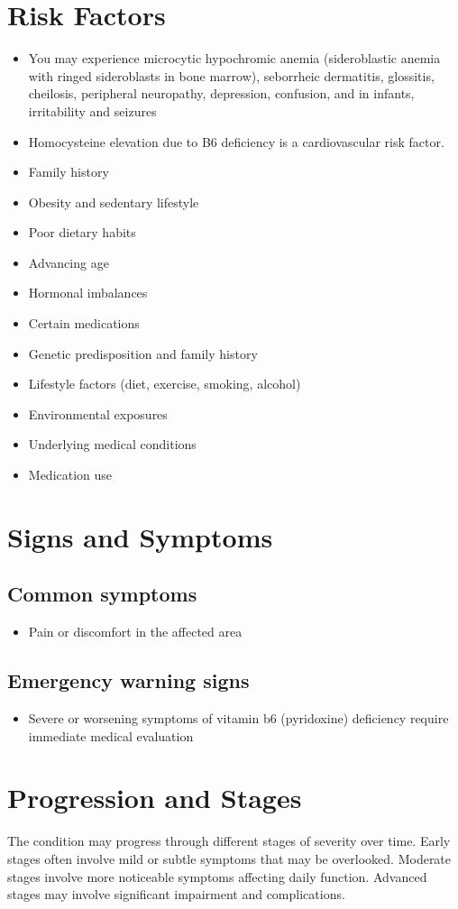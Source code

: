 \section{Risk Factors}
\begin{itemize}[noitemsep]
  \item You may experience microcytic hypochromic anemia (sideroblastic anemia with ringed sideroblasts in bone marrow), seborrheic dermatitis, glossitis, cheilosis, peripheral neuropathy, depression, confusion, and in infants, irritability and seizures
  \item Homocysteine elevation due to B6 deficiency is a cardiovascular risk factor.
  \item Family history
  \item Obesity and sedentary lifestyle
  \item Poor dietary habits
  \item Advancing age
  \item Hormonal imbalances
  \item Certain medications
  \item Genetic predisposition and family history
  \item Lifestyle factors (diet, exercise, smoking, alcohol)
  \item Environmental exposures
  \item Underlying medical conditions
  \item Medication use
\end{itemize}
\section{Signs and Symptoms}
\subsection{Common symptoms}
\begin{itemize}[noitemsep]
  \item Pain or discomfort in the affected area
  \end{itemize}
\subsection{Emergency warning signs}
\begin{itemize}[noitemsep]
  \item Severe or worsening symptoms of vitamin b6 (pyridoxine) deficiency require immediate medical evaluation
\end{itemize}
\section{Progression and Stages}
The condition may progress through different stages of severity over time. Early stages often involve mild or subtle symptoms that may be overlooked. Moderate stages involve more noticeable symptoms affecting daily function. Advanced stages may involve significant impairment and complications.
